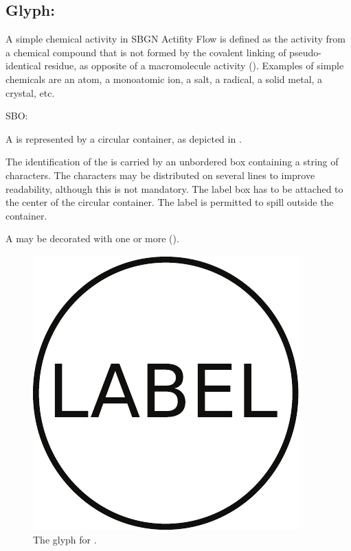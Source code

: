 \subsection{Glyph: }
\label{sec:af:simpleChemicalActivity}

A simple chemical activity in SBGN Actifity Flow is defined as the activity from a chemical compound that is not formed by the covalent linking of pseudo-identical residue, as opposite of a macromolecule activity (). Examples of simple chemicals are an atom, a monoatomic ion, a salt, a radical, a solid metal, a crystal, etc.

\begin{glyphDescription}

\glyphSboTerm SBO:

\glyphContainer A  is represented by a circular container, as depicted in .

\glyphLabel The identification of the  is carried by an unbordered box containing a string of characters.  The characters may be distributed on several lines to improve readability, although this is not mandatory.  The label box has to be attached to the center of the circular container.  The label is permitted to spill outside the container.

\glyphAux A  may be decorated with one or more  (). 

\end{glyphDescription}

\begin{figure}[H]
  \centering
  \includegraphics[scale = 0.3]{images/simpleChemical}
  \caption{The \AF glyph for .}
  \label{fig:af:simpleChemicalActivity}
\end{figure}

